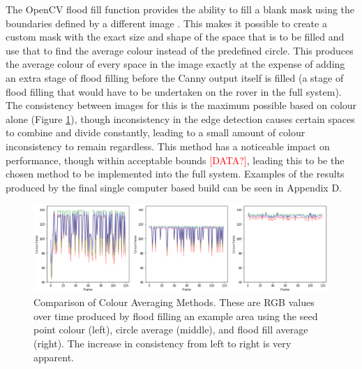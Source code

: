 The OpenCV flood fill function provides the ability to fill a blank mask using the boundaries defined by a different image \cite{bradski2008learning}. This makes it possible to create a custom mask with the exact size and shape of the space that is to be filled and use that to find the average colour instead of the predefined circle. This produces the average colour of every space in the image exactly at the expense of adding an extra stage of flood filling before the Canny output itself is filled (a stage of flood filling that would have to be undertaken on the rover in the full system). The consistency between images for this is the maximum possible based on colour alone (Figure \ref{fig:ColourConsistency}), though inconsistency in the edge detection causes certain spaces to combine and divide constantly, leading to a small amount of colour inconsistency to remain regardless. This method has a noticeable impact on performance, though within acceptable bounds \textcolor{red}{[DATA?]}, leading this to be the chosen method to be implemented into the full system. Examples of the results produced by the final single computer based build can be seen in Appendix D.

\begin{figure}[H]
    \begin{center}
      \includegraphics[width=1\textwidth]{Figures/ColourConsistency.png}
      \caption[Comparison of Colour Averaging Methods]{Comparison of Colour Averaging Methods. These are RGB values over time produced by flood filling an example area using the seed point colour (left), circle average (middle), and flood fill average (right). The increase in consistency from left to right is very apparent.}
      \label{fig:ColourConsistency}
    \end{center}
\end{figure}